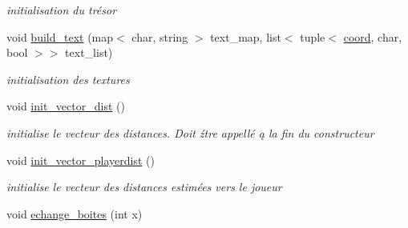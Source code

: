\begin{DoxyCompactItemize}
\begin{DoxyCompactList}\small\item\em initialisation du trésor \end{DoxyCompactList}\item 
void \hyperlink{classLabyrinthe_a719b7fe3a3e8f6be8299aab9cc1cf338}{build\+\_\+text} (map$<$ char, string $>$ text\+\_\+map, list$<$ tuple$<$ \hyperlink{structcoord}{coord}, char, bool $>$$>$ text\+\_\+list)
\begin{DoxyCompactList}\small\item\em initialisation des textures \end{DoxyCompactList}\item 
void \hyperlink{classLabyrinthe_aabe4e77af2b2e156608741a0b08aabdc}{init\+\_\+vector\+\_\+dist} ()
\begin{DoxyCompactList}\small\item\em initialise le vecteur des distances. Doit źtre appellé ą la fin du constructeur \end{DoxyCompactList}\item 
void \hyperlink{classLabyrinthe_a39850e108317404081a0dfe09a064975}{init\+\_\+vector\+\_\+playerdist} ()
\begin{DoxyCompactList}\small\item\em initialise le vecteur des distances estimées vers le joueur \end{DoxyCompactList}\item 
void \hyperlink{classLabyrinthe_a90eb03157e5078f9b84162474e0de77f}{echange\+\_\+boites} (int x)
\end{DoxyCompactItemize}
